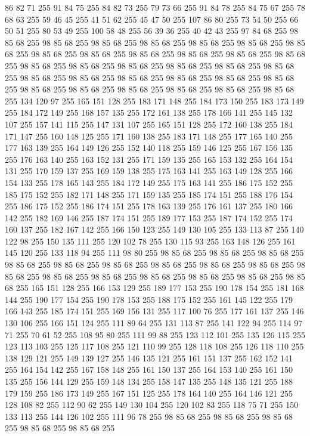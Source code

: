 86 82 71 255 91 84 75 255 84 82 73 255 79 73 66 255 91 84 78 255 84 75 67 255 78 68 63 255 59 46 45 255 41 51 62 255 45 47 50 255 107 86 80 255 73 54 50 255 66 50 51 255 80 53 49 255 100 58 48 255 56 39 36 255 40 42 43 255 97 84 68 255 98 85 68 255 98 85 68 255 98 85 68 255 98 85 68 255 98 85 68 255 98 85 68 255 98 85 68 255 98 85 68 255 98 85 68 255 98 85 68 255 98 85 68 255 98 85 68 255 98 85 68 255 98 85 68 255 98 85 68 255 98 85 68 255 98 85 68 255 98 85 68 255 98 85 68 255 98 85 68 255 98 85 68 255 98 85 68 255 98 85 68 255 98 85 68 255 98 85 68 255 98 85 68 255 98 85 68 255 98 85 68 255 98 85 68 255 98 85 68 255 98 85 68 255 134 120 97 255 165 151 128 255 183 171 148 255 184 173 150 255 183 173 149 255 184 172 149 255 168 157 135 255 172 161 138 255 178 166 141 255 145 132 107 255 157 141 115 255 147 131 107 255 165 151 128 255 172 160 138 255 184 171 147 255
160 148 125 255 171 160 138 255 183 171 148 255 177 165 140 255 177 163 139 255 164 149 126 255 152 140 118 255 159 146 125 255 167 156 135 255 176 163 140 255 163 152 131 255 171 159 135 255 165 153 132 255 164 154 131 255 170 159 137 255 169 159 138 255 175 163 141 255 163 149 128 255 166 154 133 255 178 165 143 255 184 172 149 255 175 163 141 255 186 175 152 255 185 175 152 255 182 171 148 255 171 159 135 255 185 174 151 255 188 176 154 255 186 175 152 255 186 174 151 255 178 163 139 255 176 161 137 255 180 166 142 255 182 169 146 255 187 174 151 255 189 177 153 255 187 174 152 255 174 160 137 255 182 167 142 255 166 150 123 255 149 130 105 255 133 113 87 255 140 122 98 255 150 135 111 255 120 102 78 255 130 115 93 255 163 148 126 255 161 145 120 255 133 118 94 255 111 98 80 255 98 85 68 255 98 85 68 255 98 85 68 255 98 85 68 255 98 85 68 255 98 85 68 255 98 85 68 255 98 85 68 255 98 85 68 255 98 85 68 255 98 85 68 255 98 85 68 255 98 85 68 255 98 85 68 255
98 85 68 255 98 85 68 255 165 151 128 255 166 153 129 255 189 177 153 255 190 178 154 255 181 168 144 255 190 177 154 255 190 178 153 255 188 175 152 255 161 145 122 255 179 166 143 255 185 174 151 255 169 156 131 255 117 100 76 255 177 161 137 255 146 130 106 255 166 151 124 255 111 89 64 255 131 113 87 255 141 122 94 255 114 97 71 255 70 61 52 255 108 95 80 255 111 99 88 255 123 112 101 255 135 126 115 255 123 113 103 255 125 117 108 255 121 110 99 255 128 118 108 255 126 118 110 255 138 129 121 255 149 139 127 255 146 135 121 255 161 151 137 255 162 152 141 255 164 154 142 255 167 158 148 255 161 150 137 255 164 153 140 255 161 150 135 255 156 144 129 255 159 148 134 255 158 147 135 255 148 135 121 255 188 179 159 255 186 173 149 255 167 151 125 255 178 164 140 255 164 146 121 255 128 108 82 255 112 90 62 255 149 130 104 255 120 102 83 255 118 75 71 255 150 133 113 255 144 126 102 255 111 96 78 255 98 85 68 255 98 85 68 255 98 85 68 255 98 85 68 255 98 85 68 255
